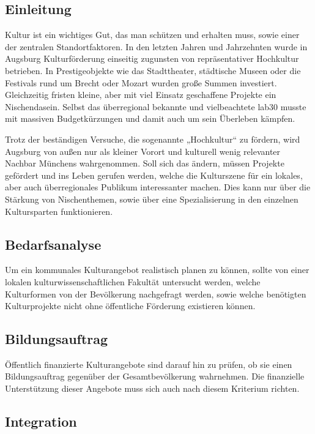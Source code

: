   \subsection{Einleitung}
  
  Kultur ist ein wichtiges Gut, das man schützen und erhalten muss, sowie 
  einer der zentralen Standortfaktoren. In den letzten Jahren und Jahrzehnten 
  wurde in Augsburg Kulturförderung einseitig zugunsten von repräsentativer 
  Hochkultur betrieben. In Prestigeobjekte wie das Stadttheater, städtische 
  Museen oder die Festivals rund um Brecht oder Mozart wurden große Summen 
  investiert. Gleichzeitig fristen kleine, aber mit viel Einsatz geschaffene 
  Projekte ein Nischendasein. Selbst das überregional bekannte und 
  vielbeachtete lab30 musste mit massiven Budgetkürzungen und damit auch um 
  sein Überleben kämpfen.
  
  Trotz der beständigen Versuche, die sogenannte „Hochkultur“ zu fördern, 
  wird Augsburg von außen nur als kleiner Vorort und kulturell wenig 
  relevanter Nachbar Münchens wahrgenommen. Soll sich das ändern, müssen 
  Projekte gefördert und ins Leben gerufen werden, welche die Kulturszene für 
  ein lokales, aber auch überregionales Publikum interessanter machen. Dies 
  kann nur über die Stärkung von Nischenthemen, sowie über eine 
  Spezialisierung in den einzelnen Kultursparten funktionieren.
  
  \subsection{Bedarfsanalyse}
  
  Um ein kommunales Kulturangebot realistisch planen zu können, sollte von 
  einer lokalen kulturwissenschaftlichen Fakultät untersucht werden, welche 
  Kulturformen von der Bevölkerung nachgefragt werden, sowie welche benötigten 
  Kulturprojekte nicht ohne öffentliche Förderung existieren können.
  
  \subsection{Bildungsauftrag}
  
  Öffentlich finanzierte Kulturangebote sind darauf hin zu prüfen, ob sie 
  einen Bildungsauftrag gegenüber der Gesamtbevölkerung wahrnehmen. Die 
  finanzielle Unterstützung dieser Angebote muss sich auch nach diesem 
  Kriterium richten.
  
  \subsection{Integration}
  
